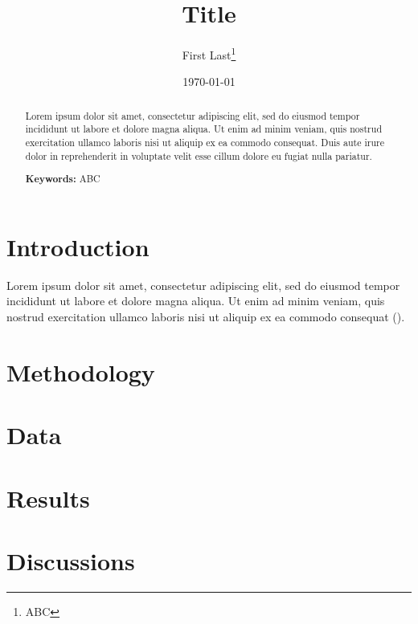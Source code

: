 \documentclass[11pt]{article}
\begin{document}
\begin{titlepage}
  \title{Title}
  \author{First Last\thanks{ABC}}
  \date{\small \today}
  \maketitle
  
  \bigskip

  \begin{abstract}
    \noindent Lorem ipsum dolor sit amet, consectetur adipiscing elit, sed do eiusmod tempor incididunt ut labore et dolore magna aliqua. Ut enim ad minim veniam, quis nostrud exercitation ullamco laboris nisi ut aliquip ex ea commodo consequat. Duis aute irure dolor in reprehenderit in voluptate velit esse cillum dolore eu fugiat nulla pariatur. 

    \bigskip

    \noindent\textbf{Keywords:} ABC
  \end{abstract}

  \setcounter{page}{0}
  \thispagestyle{empty}
\end{titlepage}

\newpage

\section{Introduction} \label{sec:Introduction}

Lorem ipsum dolor sit amet, consectetur adipiscing elit, sed do eiusmod tempor incididunt ut labore et dolore magna aliqua. Ut enim ad minim veniam, quis nostrud exercitation ullamco laboris nisi ut aliquip ex ea commodo consequat (\cite{koenker2001quantile}). 

\section{Methodology} \label{sec:Methodology}

\section{Data} \label{sec:Data}

\section{Results} \label{sec:Results}

\section{Discussions} \label{sec:Discussion}
\end{document}
